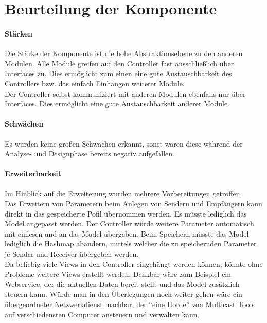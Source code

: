 \section{Beurteilung der Komponente}


\paragraph{Stärken}
Die Stärke der Komponente ist die hohe Abstraktionsebene zu den anderen Modulen. Alle Module greifen auf den Controller
fast ausschließlich über Interfaces zu. Dies ermöglicht zum einen eine gute Austauschbarkeit des Controllers bzw. das einfach Einhängen weiterer Module.\\
Der Controller selbst kommuniziert mit anderen Modulen ebenfalls nur über Interfaces. Dies ermöglicht eine gute Austauschbarkeit anderer Module.

\paragraph{Schwächen}
Es wurden keine großen Schwächen erkannt, sonst wären diese während der Analyse- und Designphase bereits negativ aufgefallen.

\paragraph{Erweiterbarkeit}
Im Hinblick auf die Erweiterung wurden mehrere Vorbereitungen getroffen.\\
Das Erweitern von Parametern beim Anlegen von Sendern und Empfängern kann direkt in das gespeicherte Pofil übernommen werden. Es müsste lediglich das Model angepasst werden.
Der Controller würde weitere Parameter automatisch mit einlesen und an das Model übergeben. Beim Speichern müsste das Model lediglich die Hashmap abändern, mittels welcher die zu speichernden
Parameter je Sender und Receiver übergeben werden.\\
Da beliebig viele Views in den Controller eingehängt werden können, könnte ohne Probleme weitere Views erstellt werden. Denkbar wäre zum Beispiel ein Webservice, der die aktuellen Daten bereit stellt und das Model zusätzlich steuern kann.
Würde man in den Überlegungen noch weiter gehen wäre ein übergeordneter Netzwerkdienst machbar, der "`eine Horde"' von Multicast Tools auf verschiedensten Computer ansteuern und verwalten kann.


